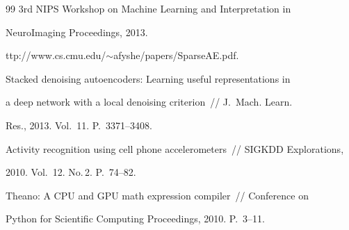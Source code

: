 {{\begin{thebibliography}{99}
3rd NIPS Workshop on Machine Learning and Interpretation in 


NeuroImaging Proceedings,  2013. 


{\sf ttp://www.cs.cmu.edu/$\sim$afyshe/papers/SparseAE.pdf}.











Stacked denoising autoencoders: Learning useful representations in


a deep network with a local denoising criterion~/\!\!/ J.~Mach. Learn.


Res., 2013. Vol.~11. P.~3371--3408.









Activity recognition using cell phone accelerometers~/\!\!/ SIGKDD Explorations, 


2010. Vol.~12. No.\,2. P.~74--82.
























Theano: A {CPU} and {GPU} math expression compiler~/\!\!/ Conference on


Python  for Scientific Computing Proceedings, 2010. P.~3--11.






\end{thebibliography}}}
